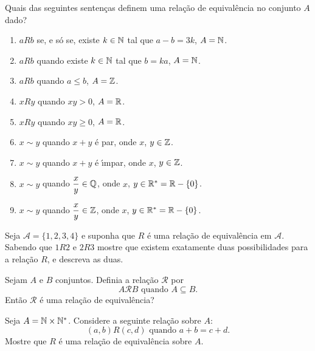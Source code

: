 \documentclass[12pt]{exam}
\begin{document}
    \vspace{.3cm}

    \questao{} Quais das seguintes senten{\c c}as definem uma rela{\c c}{\~a}o de equival{\^e}ncia no conjunto $A$ dado?
    \begin{enumerate}[label={\alph*})]
        \item $aRb$ se, e s{\'o} se, existe $k \in \mathbb{N}$ tal que $a - b = 3k$, $A = \mathbb{N}$.
        \item $aRb$ quando existe $k \in \mathbb{N}$ tal que $b = k a$, $A = \mathbb{N}$.
        \item $aRb$ quando $a \le b$, $A = \mathbb{Z}$.
        \item $xRy$ quando $xy > 0$, $ A = \mathbb{R}$.
        \item $xRy$ quando $xy \ge 0$, $ A = \mathbb{R}$.
        \item $x \sim y$ quando $x + y$ \'e par, onde $x$, $y \in \mathbb{Z}$.
        \item $x \sim y$ quando $x + y$ \'e {\'\i}mpar, onde $x$, $y \in \mathbb{Z}$.
        \item $x \sim y$ quando $\dfrac{x}{y} \in \mathbb{Q}$, onde $x$, $y \in \mathbb{R}^* = \mathbb{R} - \{0\}$.
        \item $x \sim y$ quando $\dfrac{x}{y} \in \mathbb{Z}$, onde $x$, $y \in \mathbb{R}^* = \mathbb{R} - \{0\}$.
    \end{enumerate}

    \vspace{.3cm}

    \questao{} Seja $\mathcal{A} = \{1,2,3,4\}$ e suponha que $R$ \'e uma rela\c{c}\~ao de equival\^encia em $\mathcal{A}$. Sabendo que $1R2$ e $2R3$ mostre que existem exatamente duas possibilidades para a rela\c{c}\~ao $R$, e descreva as duas.

    \vspace{.3cm}

    \questao{} Sejam $A$ e $B$ conjuntos. Definia a rela{\c c}\~ao $\mathcal{R}$ por
    \[
        A \mathcal{R} B \mbox{ quando } A \subseteq B.
    \]
    Ent\~ao $\mathcal{R}$ \'e uma rela{\c c}\~ao de equival\^encia?

    \vspace{.3cm}

    \questao{} Seja $A = \mathbb{N} \times \mathbb{N}^*$. Considere a seguinte
    rela{\c c}{\~a}o sobre $A$:
    \[
        (a,b) R (c,d) \mbox{ quando } a + b = c + d.
    \]
    Mostre que $R$ {\'e} uma rela{\c c}{\~a}o de equival{\^e}ncia sobre $A$.

    \vspace{.3cm}
\end{document}
